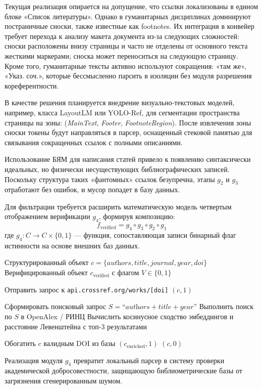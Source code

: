 Текущая реализация опирается на допущение, что ссылки локализованы в едином блоке «Список литературы». Однако в гуманитарных дисциплинах доминируют постраничные сноски, также известные как footnotes. Их интеграция в конвейер требует перехода к анализу макета документа из-за следующих сложностей: сноски расположены внизу страницы и часто не отделены от основного текста жесткими маркерами; сноска может переноситься на следующую страницу. Кроме того, гуманитарные тексты активно используют сокращения: «там же», «Указ. соч.», которые бессмысленно парсить в изоляции без модуля разрешения кореферентности.

В качестве решения планируется внедрение визуально-текстовых моделей, например, класса LayoutLM или YOLO-Ref, для сегментации пространства страницы на зоны: (\textit{MainText}, \textit{Footer}, \textit{FootnoteRegion}). После извлечения зоны сноски токены будут направляться в парсер, оснащенный стековой памятью для связывания сокращенных ссылок с полными описаниями.

Использование БЯМ для написания статей привело к появлению синтаксически идеальных, но физически несуществующих библиографических записей. Поскольку структура таких «фантомных» ссылок безупречна, этапы $g_2$ и $g_3$ отработают без ошибок, и мусор попадет в базу данных. 

Для фильтрации требуется расширить математическую модель четвертым отображением верификации $g_4$, формируя композицию:
 $$ f_{\text{verified}} = g_4 \circ g_3 \circ g_2 \circ g_1
 $$ где $g_4 : C \to C \times \{0, 1\}$ — функция, сопоставляющая записи бинарный флаг истинности на основе внешних баз данных.

\begin{algorithm}[H]
\caption{Алгоритм верификации библиографической записи}
\label{alg:verify_biblio}
\begin{algorithmic}[1]
\Require Структурированный объект $c = \{\textit{authors}, \textit{title}, \textit{journal}, \textit{year}, \textit{doi}\}$
\Ensure Верифицированный объект $c_{\text{verified}}$ с флагом $V \in \{0, 1\}$

    \State Отправить запрос к \texttt{api.crossref.org/works/[doi]}
        \State \Return $(c, 1)$
    \EndIf
\EndIf

\State Сформировать поисковый запрос $S = \text{``}\textit{authors} + \textit{title} + \textit{year}\text{''}$
\State Выполнить поиск по $S$ в OpenAlex / РИНЦ
\State Вычислить косинусное сходство эмбеддингов и расстояние Левенштейна с топ-3 результатами

    \State Обогатить $c$ валидным DOI из базы
    \State \Return $(c_{\text{enriched}}, 1)$
\Else
    \State \Return $(c, 0)$ 
\EndIf
\end{algorithmic}
\end{algorithm}

Реализация модуля $g_4$ превратит локальный парсер в систему проверки академической добросовестности, защищающую библиометрические базы от загрязнения сгенерированным шумом.